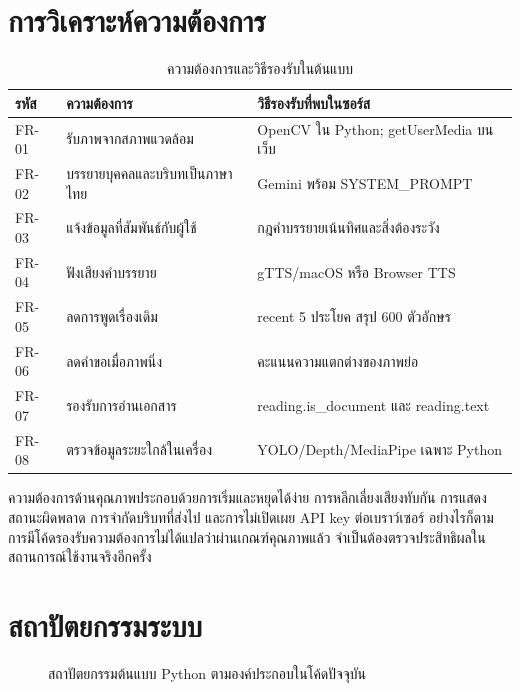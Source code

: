 \section{การวิเคราะห์ความต้องการ}
\begin{table}[H]\centering\caption{ความต้องการและวิธีรองรับในต้นแบบ}
\begin{tabularx}{\linewidth}{p{13mm}YY}\toprule รหัส & ความต้องการ & วิธีรองรับที่พบในซอร์ส\\\midrule
FR-01 & รับภาพจากสภาพแวดล้อม & OpenCV ใน Python; getUserMedia บนเว็บ\\
FR-02 & บรรยายบุคคลและบริบทเป็นภาษาไทย & Gemini พร้อม SYSTEM\_PROMPT\\
FR-03 & แจ้งข้อมูลที่สัมพันธ์กับผู้ใช้ & กฎคำบรรยายเน้นทิศและสิ่งต้องระวัง\\
FR-04 & ฟังเสียงคำบรรยาย & gTTS/macOS หรือ Browser TTS\\
FR-05 & ลดการพูดเรื่องเดิม & recent 5 ประโยค สรุป 600 ตัวอักษร\\
FR-06 & ลดคำขอเมื่อภาพนิ่ง & คะแนนความแตกต่างของภาพย่อ\\
FR-07 & รองรับการอ่านเอกสาร & reading.is\_document และ reading.text\\
FR-08 & ตรวจข้อมูลระยะใกล้ในเครื่อง & YOLO/Depth/MediaPipe เฉพาะ Python\\\bottomrule
\end{tabularx}\end{table}

ความต้องการด้านคุณภาพประกอบด้วยการเริ่มและหยุดได้ง่าย การหลีกเลี่ยงเสียงทับกัน การแสดงสถานะผิดพลาด การจำกัดบริบทที่ส่งไป และการไม่เปิดเผย API key ต่อเบราว์เซอร์ อย่างไรก็ตาม การมีโค้ดรองรับความต้องการไม่ได้แปลว่าผ่านเกณฑ์คุณภาพแล้ว จำเป็นต้องตรวจประสิทธิผลในสถานการณ์ใช้งานจริงอีกครั้ง

\section{สถาปัตยกรรมระบบ}
\begin{figure}[H]\centering
{}
\caption{สถาปัตยกรรมต้นแบบ Python ตามองค์ประกอบในโค้ดปัจจุบัน}
\label{fig:local}
\end{figure}

